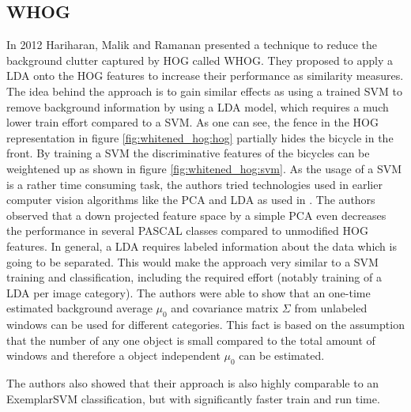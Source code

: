 \subsection{\acf*{WHOG}}
\label{sec:whitened_hog}

In 2012 Hariharan, Malik and Ramanan presented a technique \cite{Hariharan2012} to reduce the background clutter captured by \ac{HOG} called \acf{WHOG}. They proposed to apply a \ac{LDA} onto the \ac{HOG} features to increase their performance as similarity measures. The idea behind the approach is to gain similar effects as using a trained \ac{SVM} to remove background information by using a \ac{LDA} model, which requires a much lower train effort compared to a \ac{SVM}. As one can see, the fence in the \ac{HOG} representation in figure \ref{fig:whitened_hog:hog} partially hides the bicycle in the front. By training a \ac{SVM} the discriminative features of the bicycles can be weightened up as shown in figure \ref{fig:whitened_hog:svm}. As the usage of a \ac{SVM} is a rather time consuming task, the authors tried technologies used in earlier computer vision algorithms like the \ac{PCA} \cite{jolliffe2002principal} and \ac{LDA} as used in \cite{ahonen2006face}. The authors observed that a down projected feature space by a simple \ac{PCA} even decreases the performance in several PASCAL \cite{Pascal2007} classes compared to unmodified \ac{HOG} features. In general, a \ac{LDA} requires labeled information about the data which is going to be separated. This would make the approach very similar to a \ac{SVM} training and classification, including the required effort (notably training of a \ac{LDA} per image category). The authors were able to show that an one-time estimated background average $\mu_0$ and covariance matrix $\Sigma$ from unlabeled windows can be used for different categories. This fact is based on the assumption that the number of any one object is small compared to the total amount of windows and therefore a object independent $\mu_0$ can be estimated.

The authors also showed that their approach is also highly comparable to an ExemplarSVM classification, but with significantly faster train and run time. 

